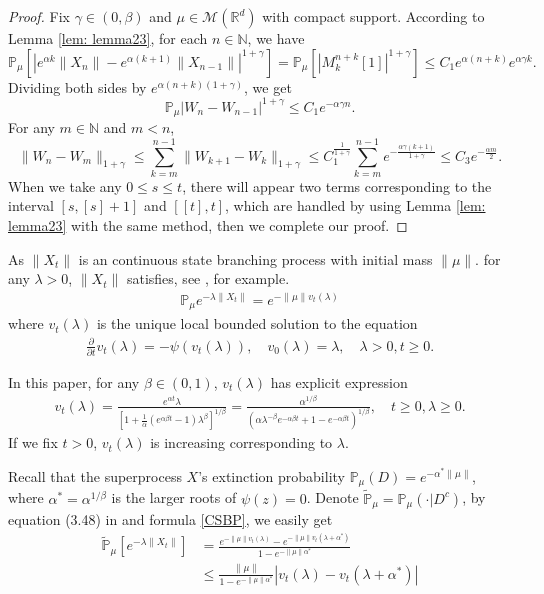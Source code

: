 \documentclass[12pt,oneside,english]{amsart}
\theoremstyle{plain}
\theoremstyle{definition}
\numberwithin{equation}{section}
\begin{document}
\begin{proof}
    Fix $\gamma \in (0,\beta)$ and $\mu\in \mathcal M(\mathbb R^d)$ with compact support.
    According to Lemma \ref{lem: lemma23}, for each $n \in \mathbb N$, we have
    $$ \mathbb{P}_{\mu}[|e^{\alpha k}\|X_n\|-e^{\alpha(k+1)}\|X_{n-1}\||^{1+\gamma}]
    = \mathbb P_\mu [|M^{n+k}_k[1]|^{1+\gamma}]
    \leq C_1 e^{\alpha(n+k)}e^{\alpha\gamma k}.$$
    Dividing both sides by $e^{\alpha(n+k)(1+\gamma)}$, we get
    $$\mathbb{P}_{\mu}\left|W_n-W_{n-1}\right|^{1+\gamma}\leq C_1 e^{-\alpha \gamma n}.$$
    For any $m\in \mathbb{N}$ and $m<n$,
    $$\|W_n-W_m\|_{1+\gamma}\leq \sum_{k=m}^{n-1}\|W_{k+1}-W_k\|_{1+\gamma}\leq C_1^{\frac{1}{1+\gamma}}\sum_{k=m}^{n-1}e^{-\frac{\alpha\gamma(k+1)}{1+\gamma}}\leq C_3 e^{-\frac{\alpha m}{2}}.$$
 When we take any $0\leq s\leq t$, there will appear two terms corresponding to the interval $[s,[s]+1]$ and $[[t],t]$, which are  handled by using Lemma \ref{lem: lemma23} with the same method, then we complete our proof.
\end{proof}
As $\|X_t\|$ is an continuous state branching process with initial mass $\|\mu\|$.
for any $\lambda>0$, $\|X_t\|$ satisfies, see \cite[Chapter 3]{Li2011Measure-valued}, for example.
\begin{align}\label{CSBP}
    \mathbb{P}_{\mu}e^{-\lambda\|X_t\|}=e^{-\|\mu\|v_t(\lambda)}
\end{align}
where $v_t(\lambda)$ is the unique local bounded solution to the equation
\begin{align*}
    \frac{\partial}{\partial t}v_t(\lambda)=-\psi(v_t(\lambda)), \quad  v_0(\lambda)=\lambda,  \quad \lambda>0, t\geq 0.
\end{align*}

In this paper, for any $\beta\in (0,1)$, $v_t(\lambda)$ has explicit expression \cite[Example 3.1]{Li2011Measure-valued}
\begin{align*}
    v_t(\lambda)=\frac{e^{\alpha t} \lambda}{[1+\frac{1}{\alpha}(e^{\alpha \beta t}-1)\lambda^{\beta}]^{1/\beta}}=\frac{\alpha^{1/\beta}}{(\alpha\lambda^{-\beta}e^{-\alpha \beta t}+1-e^{-\alpha \beta t})^{1/\beta}},\quad t\geq 0,\lambda\geq 0.
\end{align*}
If we fix $t>0$, $v_t(\lambda)$ is increasing corresponding to $\lambda$.

Recall that the superprocess $X$'s extinction probability $\mathbb{P}_{\mu}(D)=e^{-\alpha^*\|\mu\|}$, where $\alpha^*=\alpha^{1/\beta}$ is the larger roots of $\psi(z)=0$. Denote $\mathbb{\tilde{P}}_{\mu}=\mathbb{P}_{\mu}(\cdot|D^c)$, by equation (3.48) in\cite{Li2011Measure-valued} and formula \eqref{CSBP}, we easily get
\begin{align}
    \mathbb{\tilde{P}}_{\mu}[e^{-\lambda \|X_t\|}]&=\frac{e^{-\|\mu\|v_t(\lambda)}-e^{-\|\mu\|v_t(\lambda+\alpha^*)}}{1-e^{-\|\mu\|\alpha^*}}\nonumber\\
        &\leq \frac{\|\mu\|}{1-e^{-\|\mu\|\alpha^*}}\left|v_t(\lambda)-v_t(\lambda+\alpha^*)\right| \label{laplaceexpress}
\end{align}
\end{document}
